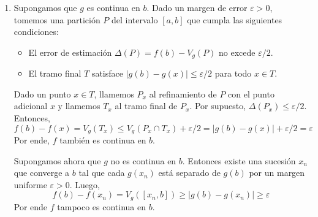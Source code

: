 \begin{solution}
\begin{enumerate}[label=(\alph*)]
    \item Supongamos que $g$ es continua en $b$. Dado un margen de error $\varepsilon > 0$, tomemos una partición $P$ del intervalo $[a,b]$ que cumpla las siguientes condiciones:
    \begin{itemize}
        \item El error de estimación $\Delta(P) = f(b) - V_g(P)$ no excede $\varepsilon/2$.
        \item El tramo final $T$ satisface $|g(b) - g(x)| \le \varepsilon/2$ para todo $x \in T$.
    \end{itemize}
    
    Dado un punto $x \in T$, llamemos $P_x$ al refinamiento de $P$ con el punto adicional $x$ y llamemos $T_x$ al tramo final de $P_x$. Por supuesto, $\Delta(P_x) \le \varepsilon/2$. Entonces,
    $$f(b) - f(x) = V_g(T_x) \le V_g(P_x \cap T_x) + \varepsilon/2 = |g(b) - g(x)| + \varepsilon/2 = \varepsilon$$
    Por ende, $f$ también es continua en $b$.
    
    Supongamos ahora que $g$ no es continua en $b$. Entonces existe una sucesión $x_n$ que converge a $b$ tal que cada $g(x_n)$ está separado de $g(b)$ por un margen uniforme $\varepsilon > 0$. Luego,
    $$f(b) - f(x_n) = V_g([x_n, b]) \ge |g(b) - g(x_n)| \ge \varepsilon$$
    Por ende $f$ tampoco es continua en $b$.
\end{enumerate}
\end{solution}
